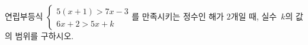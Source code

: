 연립부등식 $\begin{cases} 5(x+1)>7x-3 \\ 6x+2>5x+k \end{cases}$를 만족시키는 정수인 해가 $2$개일 때, 실수~$k$의 값의 범위를 구하시오.
